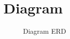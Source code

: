 \section*{Diagram}
\par{

\begin{figure}[h!]
    \centering
    \caption{Diagram ERD}
    \label{fig:my_label}
\end{figure}
}